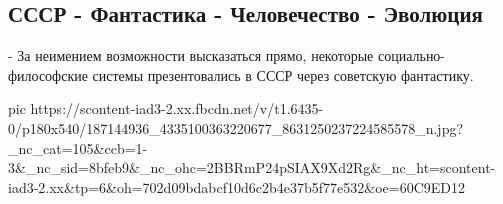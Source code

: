  
 
 
 
 
\subsection{СССР - Фантастика - Человечество - Эволюция}
\label{sec:17_05_2021.fb.arestovich_aleksej.1.fantastika_sssr_chelovechestvo}

- За неимением возможности высказаться прямо, некоторые социально-философские
системы презентовались в СССР через советскую фантастику. 

\ifcmt
  pic https://scontent-iad3-2.xx.fbcdn.net/v/t1.6435-0/p180x540/187144936_4335100363220677_8631250237224585578_n.jpg?_nc_cat=105&ccb=1-3&_nc_sid=8bfeb9&_nc_ohc=2BBRmP24pSIAX9Xd2Rg&_nc_ht=scontent-iad3-2.xx&tp=6&oh=702d09bdabcf10d6c2b4e37b5f77e532&oe=60C9ED12
\fi


